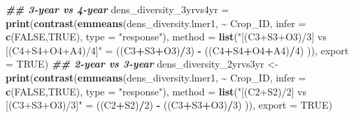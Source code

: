 \documentclass[
]{article}
\newenvironment{Shaded}{\begin{snugshade}}{\end{snugshade}}
\newcommand{\AttributeTok}[1]{\textcolor[rgb]{0.13,0.29,0.53}{#1}}
\newcommand{\ConstantTok}[1]{\textcolor[rgb]{0.56,0.35,0.01}{#1}}
\newcommand{\DecValTok}[1]{\textcolor[rgb]{0.00,0.00,0.81}{#1}}
\newcommand{\DocumentationTok}[1]{\textcolor[rgb]{0.56,0.35,0.01}{\textbf{\textit{#1}}}}
\newcommand{\FunctionTok}[1]{\textcolor[rgb]{0.13,0.29,0.53}{\textbf{#1}}}
\newcommand{\NormalTok}[1]{#1}
\newcommand{\OtherTok}[1]{\textcolor[rgb]{0.56,0.35,0.01}{#1}}
\newcommand{\SpecialCharTok}[1]{\textcolor[rgb]{0.81,0.36,0.00}{\textbf{#1}}}
\newcommand{\StringTok}[1]{\textcolor[rgb]{0.31,0.60,0.02}{#1}}
\begin{document}
\begin{Shaded}
\begin{Highlighting}[]
\DocumentationTok{\#\# 3{-}year vs 4{-}year}
\NormalTok{dens\_diversity\_3yrvs4yr }\OtherTok{=} \FunctionTok{print}\NormalTok{(}\FunctionTok{contrast}\NormalTok{(}\FunctionTok{emmeans}\NormalTok{(dens\_diversity.lmer1, }\SpecialCharTok{\textasciitilde{}}\NormalTok{ Crop\_ID, }
                                                 \AttributeTok{infer =} \FunctionTok{c}\NormalTok{(}\ConstantTok{FALSE}\NormalTok{,}\ConstantTok{TRUE}\NormalTok{), }
                                                 \AttributeTok{type =} \StringTok{"response"}\NormalTok{),}
                                         \AttributeTok{method =} \FunctionTok{list}\NormalTok{(}\StringTok{"[(C3+S3+O3)/3] vs [(C4+S4+O4+A4)/4]"} \OtherTok{=} 
\NormalTok{                                                         ((C3}\SpecialCharTok{+}\NormalTok{S3}\SpecialCharTok{+}\NormalTok{O3)}\SpecialCharTok{/}\DecValTok{3}\NormalTok{) }\SpecialCharTok{{-}}\NormalTok{ ((C4}\SpecialCharTok{+}\NormalTok{S4}\SpecialCharTok{+}\NormalTok{O4}\SpecialCharTok{+}\NormalTok{A4)}\SpecialCharTok{/}\DecValTok{4}\NormalTok{) )), }
                                \AttributeTok{export =} \ConstantTok{TRUE}\NormalTok{)}
\DocumentationTok{\#\# 2{-}year vs 3{-}year }
\NormalTok{dens\_diversity\_2yrvs3yr }\OtherTok{\textless{}{-}} \FunctionTok{print}\NormalTok{(}\FunctionTok{contrast}\NormalTok{(}\FunctionTok{emmeans}\NormalTok{(dens\_diversity.lmer1, }\SpecialCharTok{\textasciitilde{}}\NormalTok{ Crop\_ID, }
                                                  \AttributeTok{infer =} \FunctionTok{c}\NormalTok{(}\ConstantTok{FALSE}\NormalTok{,}\ConstantTok{TRUE}\NormalTok{), }
                                                  \AttributeTok{type =} \StringTok{"response"}\NormalTok{),}
                                          \AttributeTok{method =} \FunctionTok{list}\NormalTok{(}\StringTok{"[(C2+S2)/2] vs [(C3+S3+O3)/3]"} \OtherTok{=} 
\NormalTok{                                                          ((C2}\SpecialCharTok{+}\NormalTok{S2)}\SpecialCharTok{/}\DecValTok{2}\NormalTok{) }\SpecialCharTok{{-}}\NormalTok{ ((C3}\SpecialCharTok{+}\NormalTok{S3}\SpecialCharTok{+}\NormalTok{O3)}\SpecialCharTok{/}\DecValTok{3}\NormalTok{) )),}
                                 \AttributeTok{export =} \ConstantTok{TRUE}\NormalTok{)}


\end{Highlighting}
\end{Shaded}
\end{document}
